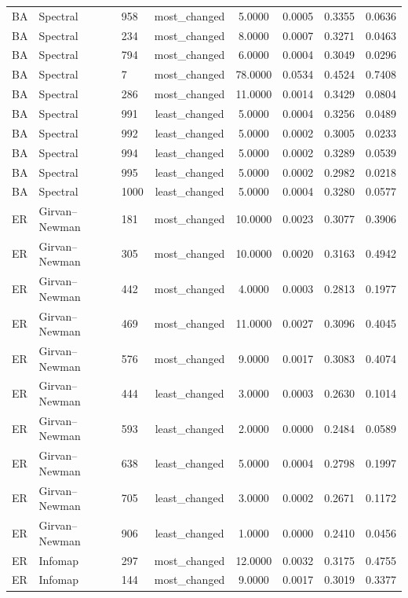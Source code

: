 \begin{longtable}{lllccccc}
BA & Spectral & 958 & most\_changed & 5.0000 & 0.0005 & 0.3355 & 0.0636 \\
BA & Spectral & 234 & most\_changed & 8.0000 & 0.0007 & 0.3271 & 0.0463 \\
BA & Spectral & 794 & most\_changed & 6.0000 & 0.0004 & 0.3049 & 0.0296 \\
BA & Spectral & 7 & most\_changed & 78.0000 & 0.0534 & 0.4524 & 0.7408 \\
BA & Spectral & 286 & most\_changed & 11.0000 & 0.0014 & 0.3429 & 0.0804 \\
BA & Spectral & 991 & least\_changed & 5.0000 & 0.0004 & 0.3256 & 0.0489 \\
BA & Spectral & 992 & least\_changed & 5.0000 & 0.0002 & 0.3005 & 0.0233 \\
BA & Spectral & 994 & least\_changed & 5.0000 & 0.0002 & 0.3289 & 0.0539 \\
BA & Spectral & 995 & least\_changed & 5.0000 & 0.0002 & 0.2982 & 0.0218 \\
BA & Spectral & 1000 & least\_changed & 5.0000 & 0.0004 & 0.3280 & 0.0577 \\
ER & Girvan--Newman & 181 & most\_changed & 10.0000 & 0.0023 & 0.3077 & 0.3906 \\
ER & Girvan--Newman & 305 & most\_changed & 10.0000 & 0.0020 & 0.3163 & 0.4942 \\
ER & Girvan--Newman & 442 & most\_changed & 4.0000 & 0.0003 & 0.2813 & 0.1977 \\
ER & Girvan--Newman & 469 & most\_changed & 11.0000 & 0.0027 & 0.3096 & 0.4045 \\
ER & Girvan--Newman & 576 & most\_changed & 9.0000 & 0.0017 & 0.3083 & 0.4074 \\
ER & Girvan--Newman & 444 & least\_changed & 3.0000 & 0.0003 & 0.2630 & 0.1014 \\
ER & Girvan--Newman & 593 & least\_changed & 2.0000 & 0.0000 & 0.2484 & 0.0589 \\
ER & Girvan--Newman & 638 & least\_changed & 5.0000 & 0.0004 & 0.2798 & 0.1997 \\
ER & Girvan--Newman & 705 & least\_changed & 3.0000 & 0.0002 & 0.2671 & 0.1172 \\
ER & Girvan--Newman & 906 & least\_changed & 1.0000 & 0.0000 & 0.2410 & 0.0456 \\
ER & Infomap & 297 & most\_changed & 12.0000 & 0.0032 & 0.3175 & 0.4755 \\
ER & Infomap & 144 & most\_changed & 9.0000 & 0.0017 & 0.3019 & 0.3377 \\

\end{longtable}
